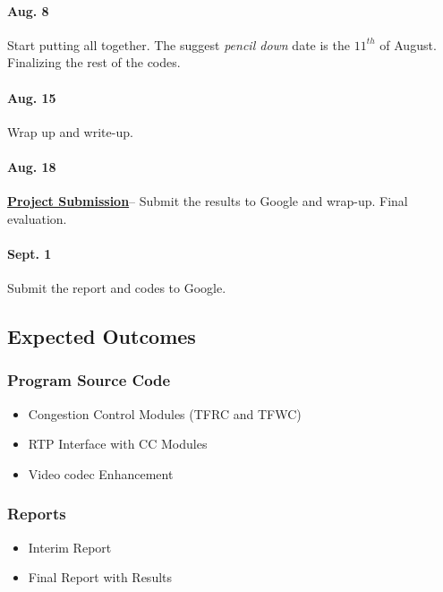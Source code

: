 \paragraph{\textsf{Aug. 8}} Start putting all together. The suggest \emph{pencil
down} date is the $11^{th}$ of August. Finalizing the rest of the codes.

\paragraph{\textsf{Aug. 15}} Wrap up and write-up.

\paragraph{\textsf{Aug. 18}} \underline{\textbf{Project Submission}}-- Submit
the results to Google and wrap-up. Final evaluation. 

\paragraph{\textsf{Sept. 1}} Submit the report and codes to Google.


\subsection{\label{ssec:outcomes}Expected Outcomes}

\subsubsection{\label{sssec:codes}Program Source Code}

\begin{itemize} 
\item Congestion Control Modules (TFRC and TFWC) 
\item RTP Interface with CC Modules 
\item Video codec Enhancement 
\end{itemize}

\subsubsection{\label{sssec:docs}Reports}

\begin{itemize}
\item Interim Report
\item Final Report with Results
\end{itemize}

\newpage
